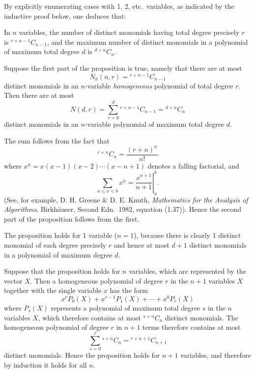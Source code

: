 By explicitly enumerating cases with 1, 2, etc.\ variables, as
indicated by the inductive proof below, one deduces that:

\begin{prop}
  In $n$ variables, the number of distinct monomials having total
  degree precisely $r$ is $^{r+n-1}C_{n-1}$, and the maximum number of
  distinct monomials in a polynomial of maximum total degree $d$ is
  $^{d+n}C_n$.
\end{prop}

\begin{randpproof}
  Suppose the first part of the proposition is true, namely that there
  are at most
  \[
    N_h(n,r) = {}^{r+n-1}C_{n-1}
  \]
  distinct monomials in an $n$-variable {\em homogeneous\/}
  polynomial of total degree $r$.  Then there are at most
  \[
    N(d,r) = \sum_{r=0}^d {}^{r+n-1}C_{n-1} = {}^{d+n}C_n
  \]
  distinct monomials in an $n$-variable polynomial of maximum total
  degree $d$.

  The sum follows from the fact that
  \[
    {}^{r+n}C_n = \frac{(r+n)^{\underline n}}{n!}
  \]
  where $x^{\underline n} = x(x-1)(x-2)\cdots(x-n+1)$ denotes a
  falling factorial, and
  \[
    \sum_{a \leq x < b} x^{\underline n} =
    \left. \frac{x^{\underline{n+1}}}{n+1} \right|_a^b.
  \]
  (See, for example, D. H. Greene \& D. E. Knuth, {\it Mathematics
  for the Analysis of Algorithms}, Birkh\"auser, Second Edn.\ 1982,
  equation (1.37)).  Hence the second part of the proposition follows
  from the first.

  The proposition holds for 1 variable ($n = 1$), because there is
  clearly 1 distinct monomial of each degree precisely $r$ and hence
  at most $d+1$ distinct monomials in a polynomial of maximum degree
  $d$.

  Suppose that the proposition holds for $n$ variables, which are
  represented by the vector $X$.  Then a homogeneous polynomial of
  degree $r$ in the $n+1$ variables $X$ together with the single
  variable $x$ has the form
  \[
    x^r P_0(X) + x^{r-1} P_1(X) + \cdots + x^0 P_r(X)
  \]
  where $P_s(X)$ represents a polynomial of maximum total degree $s$
  in the $n$ variables $X$, which therefore contains at most
  $^{s+n}C_n$ distinct monomials.  The homogeneous polynomial of
  degree $r$ in $n+1$ terms therefore contains at most
  \[
    \sum_{s=0}^r {}^{s+n}C_n = {}^{r+n+1}C_{n+1}
  \]
  distinct monomials.
  Hence the proposition holds for $n+1$ variables, and therefore by
  induction it holds for all $n$.
\end{randpproof}


